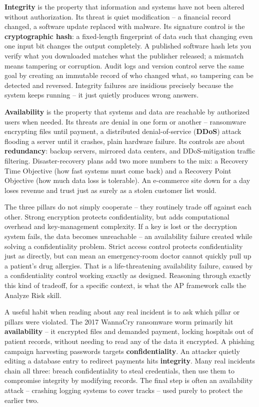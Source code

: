 \textbf{Integrity} is the property that information and systems have not been altered without
authorization. Its threat is quiet modification -- a financial record changed, a software update
replaced with malware. Its signature control is the \textbf{cryptographic hash}: a
fixed-length fingerprint of data such that changing even one input bit changes the output
completely. A published software hash lets you verify what you downloaded matches what the
publisher released; a mismatch means tampering or corruption. Audit logs and version control
serve the same goal by creating an immutable record of who changed what, so tampering can be
detected and reversed. Integrity failures are insidious precisely because the system keeps
running -- it just quietly produces wrong answers.

\textbf{Availability} is the property that systems and data are reachable by authorized users when
needed. Its threats are denial in one form or another -- ransomware encrypting files until
payment, a distributed denial-of-service (\textbf{DDoS}) attack flooding a server until it
crashes, plain hardware failure. Its controls are about \textbf{redundancy}: backup
servers, mirrored data centers, and DDoS-mitigation traffic filtering. Disaster-recovery plans add
two more numbers to the mix: a Recovery Time Objective (how fast systems must come back) and a
Recovery Point Objective (how much data loss is tolerable). An e-commerce site down for a day
loses revenue and trust just as surely as a stolen customer list would.

\begin{example}
The three pillars do not simply cooperate -- they routinely trade off against each other. Strong
encryption protects confidentiality, but adds computational overhead and key-management
complexity. If a key is lost or the decryption system fails, the data becomes unreachable -- an
availability failure created while solving a confidentiality problem. Strict access control
protects confidentiality just as directly, but can mean an emergency-room doctor cannot quickly
pull up a patient's drug allergies. That is a life-threatening availability failure, caused by a
confidentiality control working exactly as designed. Reasoning through exactly this kind of
tradeoff, for a specific context, is what the AP framework calls the Analyze Risk skill.
\end{example}

A useful habit when reading about any real incident is to ask which pillar or pillars were
violated. The 2017 WannaCry ransomware worm primarily hit \textbf{availability} -- it encrypted
files and demanded payment, locking hospitals out of patient records, without needing to read any
of the data it encrypted. A phishing campaign harvesting passwords targets
\textbf{confidentiality}. An attacker quietly editing a database entry to redirect payments hits
\textbf{integrity}. Many real incidents chain all three: breach confidentiality to steal
credentials, then use them to compromise integrity by modifying records. The final step is often
an availability attack -- crashing logging systems to cover tracks -- used purely to protect the
earlier two.

